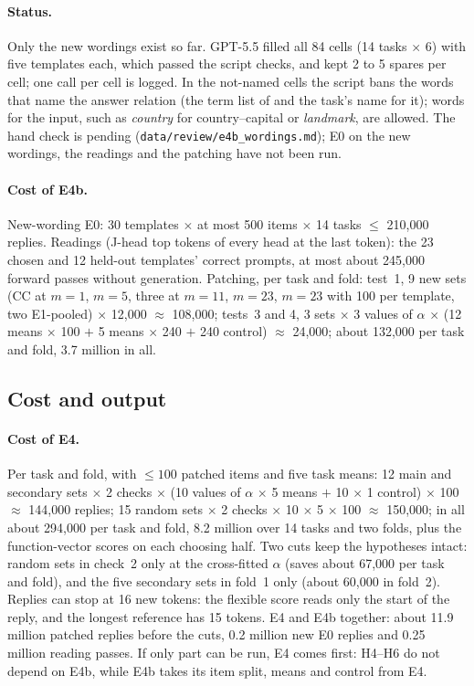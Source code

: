 \documentclass[11pt,a4paper]{article}
\begin{document}
\paragraph{Status.} Only the new wordings exist so far. GPT-5.5 filled all 84 cells (14 tasks $\times$ 6) with five templates each, which passed the script checks, and kept 2 to 5 spares per cell; one call per cell is logged. In the not-named cells the script bans the words that name the answer relation (the term list of \citet{yang2026shared} and the task's name for it); words for the input, such as \emph{country} for country--capital or \emph{landmark}, are allowed. The hand check is pending (\texttt{data/review/e4b\_wordings.md}); E0 on the new wordings, the readings and the patching have not been run.

\paragraph{Cost of E4b.} New-wording E0: 30 templates $\times$ at most 500 items $\times$ 14
tasks $\le$ 210{,}000 replies. Readings (J-head top tokens of every head at the last token): the
23 chosen and 12 held-out templates' correct prompts, at most about 245{,}000 forward passes
without generation. Patching, per task and fold: test~1, 9 new sets (CC at $m = 1$, $m = 5$,
three at $m = 11$, $m = 23$, $m = 23$ with 100 per template, two E1-pooled) $\times$ 12{,}000
$\approx$ 108{,}000; tests~3 and 4, 3 sets $\times$ 3 values of $\alpha$ $\times$ (12 means
$\times$ 100 $+$ 5 means $\times$ 240 $+$ 240 control) $\approx$ 24{,}000; about 132{,}000 per
task and fold, 3.7 million in all.

\subsection{Cost and output}

\paragraph{Cost of E4.} Per task and fold, with $\le 100$ patched items and five task means:
12 main and secondary sets $\times$ 2 checks $\times$ (10 values of $\alpha$ $\times$ 5 means
$+$ 10 $\times$ 1 control) $\times$ 100 $\approx$ 144{,}000 replies; 15 random sets $\times$ 2
checks $\times$ 10 $\times$ 5 $\times$ 100 $\approx$ 150{,}000; in all about 294{,}000 per task
and fold, 8.2 million over 14 tasks and two folds, plus the function-vector scores on each
choosing half. Two cuts keep the hypotheses intact: random sets in check~2 only at the
cross-fitted $\alpha$ (saves about 67{,}000 per task and fold), and the five secondary sets in
fold~1 only (about 60{,}000 in fold~2). Replies can stop at 16 new tokens: the flexible score
reads only the start of the reply, and the longest reference has 15 tokens. E4 and E4b
together: about 11.9 million patched replies before the cuts, 0.2 million new E0 replies and
0.25 million reading passes. If only part can be run, E4 comes first: H4--H6 do not depend on
E4b, while E4b takes its item split, means and control from E4.
\end{document}
